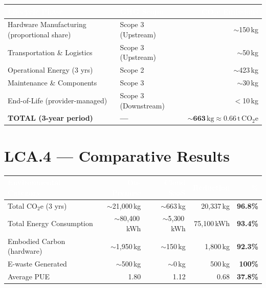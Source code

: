 \vspace{0.5em}
\begin{tabularx}{\textwidth}{X l r}
\toprule
\rowcolor{headerrow}
\textcolor{white}{\textbf{Lifecycle Phase}} &
\textcolor{white}{\textbf{GHG Scope}} &
\textcolor{white}{\textbf{CO$_2$e Emissions}} \\
\midrule
\rowcolor{rowalt} Hardware Manufacturing (proportional share) & Scope 3 (Upstream) & $\sim$150\,kg \\
                  Transportation \& Logistics & Scope 3 (Upstream) & $\sim$50\,kg \\
\rowcolor{rowalt} Operational Energy (3 yrs) & Scope 2             & $\sim$423\,kg \\
                  Maintenance \& Components   & Scope 3             & $\sim$30\,kg \\
\rowcolor{rowalt} End-of-Life (provider-managed) & Scope 3 (Downstream) & $<$10\,kg \\
\midrule
\rowcolor{palegreen}
  \textbf{TOTAL (3-year period)} & \textbf{---} &
  $\mathbf{\sim\!663\,\mathrm{kg} \approx 0.66\,\mathrm{t\,CO_2e}}$ \\
\bottomrule
\end{tabularx}

\section{LCA.4 --- Comparative Results}

\vspace{0.5em}
\begin{tabularx}{\textwidth}{X r r r r}
\toprule
\rowcolor{headerrow}
\textcolor{white}{\textbf{Environmental Category}} &
\textcolor{white}{\textbf{On-Premise}} &
\textcolor{white}{\textbf{Cloud SaaS}} &
\textcolor{white}{\textbf{Reduction}} &
\textcolor{white}{\textbf{\%}} \\
\midrule
\rowcolor{rowalt}
  Total CO$_2$e (3 yrs)      & $\sim$21{,}000\,kg & $\sim$663\,kg    & 20{,}337\,kg & \textbf{96.8\%} \\
  Total Energy Consumption   & $\sim$80{,}400\,kWh& $\sim$5{,}300\,kWh& 75{,}100\,kWh & \textbf{93.4\%} \\
\rowcolor{rowalt}
  Embodied Carbon (hardware) & $\sim$1{,}950\,kg  & $\sim$150\,kg    & 1{,}800\,kg  & \textbf{92.3\%} \\
  E-waste Generated          & $\sim$500\,kg      & $\sim$0\,kg      & 500\,kg      & \textbf{100\%}  \\
\rowcolor{rowalt}
  Average PUE                & 1.80               & 1.12             & 0.68         & \textbf{37.8\%} \\
\bottomrule
\end{tabularx}

